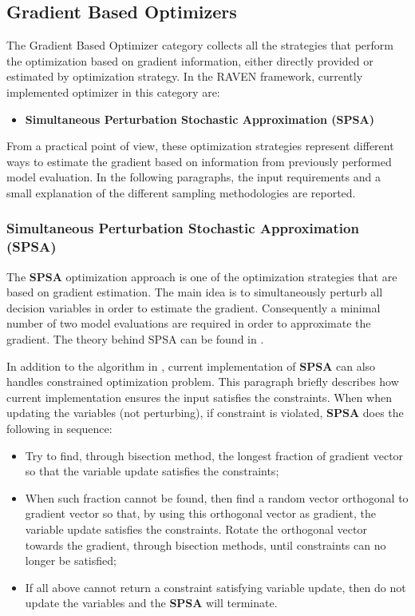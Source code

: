 \subsection{Gradient Based Optimizers}
\label{subsec:gradientBasedOptimizers}
The Gradient Based Optimizer category collects all the strategies that perform the optimization based on gradient information,
 either directly provided or estimated by optimization strategy. In the RAVEN framework, currently implemented optimizer in this
 category are:
\begin{itemize}
\item \textbf{Simultaneous Perturbation Stochastic Approximation (SPSA)}
\end{itemize}

From a practical point of view, these optimization strategies represent different ways to estimate the gradient based on information
from previously performed model evaluation. In the following paragraphs, the input requirements and a small explanation of the
different sampling methodologies are reported.


\subsubsection{Simultaneous Perturbation Stochastic Approximation (SPSA)}
\label{subsubsubsec:SPSA}
The \textbf{SPSA} optimization approach is one of the optimization strategies that are based on gradient estimation. The main 
idea is to simultaneously perturb all decision variables in order to estimate the gradient. Consequently a minimal number of two 
model evaluations are required in order to approximate the gradient. The theory behind SPSA can be found in 
\cite{spall1998implementation}.

In addition to the algorithm in \cite{spall1998implementation}, current implementation of \textbf{SPSA} can also handles 
constrained optimization problem. This paragraph briefly describes how current implementation ensures the input satisfies the 
constraints. When when updating the variables (not perturbing), if constraint is violated, \textbf{SPSA} does the following in 
sequence:
\begin{itemize}
\item Try to find, through bisection method, the longest fraction of gradient vector so that the variable update satisfies the 
constraints;
\item When such fraction cannot be found, then find a random vector orthogonal to gradient vector so that, by using this 
orthogonal vector as gradient, the variable update satisfies the constraints. Rotate the orthogonal vector towards the gradient, 
through bisection methods, until constraints can no longer be satisfied;
\item If all above cannot return a constraint satisfying variable update, then do not update the variables and the \textbf{SPSA} will 
terminate.
\end{itemize}


